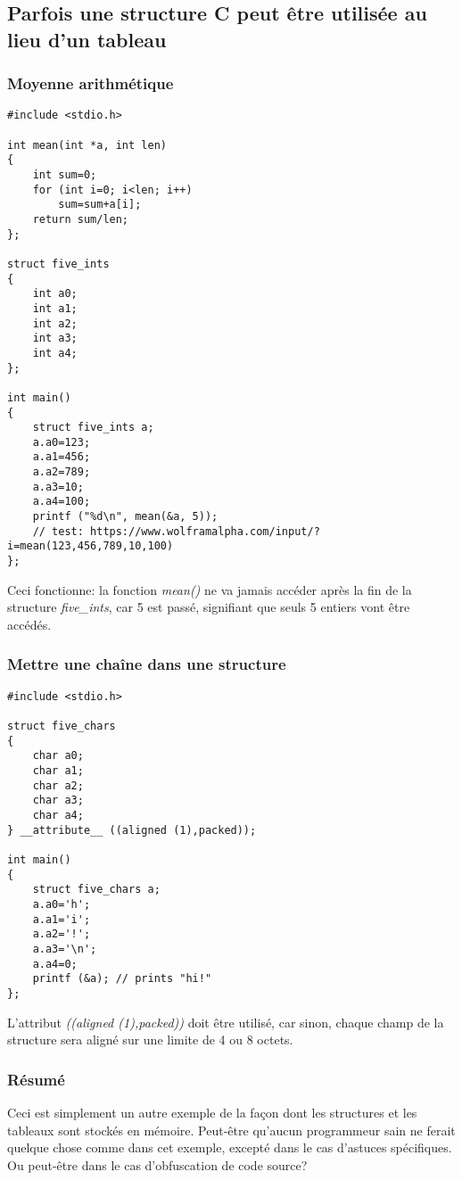 \subsection{Parfois une structure C peut être utilisée au lieu d'un tableau}

\subsubsection{Moyenne arithmétique}

\begin{lstlisting}[style=customc]
#include <stdio.h>

int mean(int *a, int len)
{
	int sum=0;
	for (int i=0; i<len; i++)
		sum=sum+a[i];
	return sum/len;
};

struct five_ints
{
	int a0;
	int a1;
	int a2;
	int a3;
	int a4;
};

int main()
{
	struct five_ints a;
	a.a0=123;
	a.a1=456;
	a.a2=789;
	a.a3=10;
	a.a4=100;
	printf ("%d\n", mean(&a, 5));
	// test: https://www.wolframalpha.com/input/?i=mean(123,456,789,10,100)
};
\end{lstlisting}

Ceci fonctionne: la fonction \emph{mean()} ne va jamais accéder après la fin de la
structure \emph{five\_ints}, car 5 est passé, signifiant que seuls 5 entiers vont être
accédés.

\subsubsection{Mettre une chaîne dans une structure}

\begin{lstlisting}[style=customc]
#include <stdio.h>

struct five_chars
{
	char a0;
	char a1;
	char a2;
	char a3;
	char a4;
} __attribute__ ((aligned (1),packed));

int main()
{
	struct five_chars a;
	a.a0='h';
	a.a1='i';
	a.a2='!';
	a.a3='\n';
	a.a4=0;
	printf (&a); // prints "hi!"
};
\end{lstlisting}

L'attribut \emph{((aligned (1),packed))} doit être utilisé, car sinon, chaque champ
de la structure sera aligné sur une limite de 4 ou 8 octets.

\subsubsection{Résumé}

Ceci est simplement un autre exemple de la façon dont les structures et les tableaux
sont stockés en mémoire.
Peut-être qu'aucun programmeur sain ne ferait quelque chose comme dans cet exemple,
excepté dans le cas d'astuces spécifiques.
Ou peut-être dans le cas d'obfuscation de code source?

